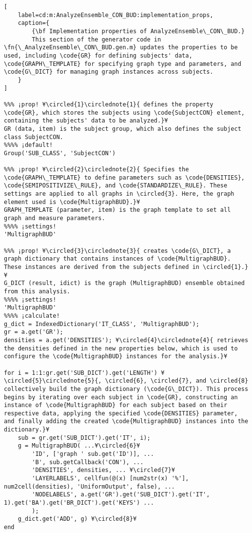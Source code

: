 \documentclass{tufte-handout}
\begin{document}
\begin{lstlisting}[
	label=cd:m:AnalyzeEnsemble_CON_BUD:implementation_props,
	caption={
		{\bf Implementation properties of AnalyzeEnsemble\_CON\_BUD.}
		This section of the generator code in \fn{\_AnalyzeEnsemble\_CON\_BUD.gen.m} updates the properties to be used, including \code{GR} for defining subjects' data, \code{GRAPH\_TEMPLATE} for specifying graph type and parameters, and \code{G\_DICT} for managing graph instances across subjects.
	}
]

%%% ¡prop! ¥\circled{1}\circlednote{1}{ defines the property \code{GR}, which stores the subjects using \code{SubjectCON} element, containing the subjects' data to be analyzed.}¥
GR (data, item) is the subject group, which also defines the subject class SubjectCON.
%%%% ¡default!
Group('SUB_CLASS', 'SubjectCON')

%%% ¡prop! ¥\circled{2}\circlednote{2}{ Specifies the \code{GRAPH\_TEMPLATE} to define parameters such as \code{DENSITIES}, \code{SEMIPOSITIVIZE\_RULE}, and \code{STANDARDIZE\_RULE}. These settings are applied to all graphs in \circled{3}. Here, the graph element used is \code{MultigraphBUD}.}¥
GRAPH_TEMPLATE (parameter, item) is the graph template to set all graph and measure parameters.
%%%% ¡settings!
'MultigraphBUD'

%%% ¡prop! ¥\circled{3}\circlednote{3}{ creates \code{G\_DICT}, a graph dictionary that contains instances of \code{MultigraphBUD}. These instances are derived from the subjects defined in \circled{1}.}¥
G_DICT (result, idict) is the graph (MultigraphBUD) ensemble obtained from this analysis.
%%%% ¡settings!
'MultigraphBUD'
%%%% ¡calculate!
g_dict = IndexedDictionary('IT_CLASS', 'MultigraphBUD');
gr = a.get('GR');
densities = a.get('DENSITIES'); ¥\circled{4}\circlednote{4}{ retrieves the densities defined in the new properties below, which is used to configure the \code{MultigraphBUD} instances for the analysis.}¥

for i = 1:1:gr.get('SUB_DICT').get('LENGTH') ¥\circled{5}\circlednote{5}{, \circled{6}, \circled{7}, and \circled{8} collectively build the graph dictionary (\code{G\_DICT}). This process begins by iterating over each subject in \code{GR}, constructing an instance of \code{MultigraphBUD} for each subject based on their respective data, applying the specified \code{DENSITIES} parameter, and finally adding the created \code{MultigraphBUD} instances into the dictionary.}¥
	sub = gr.get('SUB_DICT').get('IT', i);
    g = MultigraphBUD( ...¥\circled{6}¥
        'ID', ['graph ' sub.get('ID')], ...
        'B', sub.getCallback('CON'), ...
        'DENSITIES', densities, ... ¥\circled{7}¥
        'LAYERLABELS', cellfun(@(x) [num2str(x) '%'], num2cell(densities), 'UniformOutput', false), ...
        'NODELABELS', a.get('GR').get('SUB_DICT').get('IT', 1).get('BA').get('BR_DICT').get('KEYS') ...
        );
    g_dict.get('ADD', g) ¥\circled{8}¥
end


\end{lstlisting}
\end{document}
